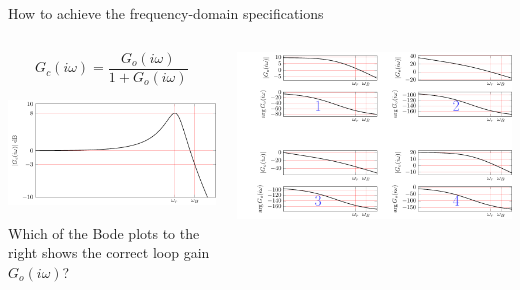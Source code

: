\documentclass[presentation,aspectratio=169]{beamer}
\begin{document}
\begin{frame}[label={sec:org7b0788d}]{How to achieve the frequency-domain specifications}
\begin{columns}
\begin{column}{0.28\columnwidth}
\[G_c(i\omega) = \frac{ G_o(i\omega)}{1 + G_o(i\omega)}\]

\includegraphics[width=1.1\linewidth]{../../figures/spec-bode-closed-loop-new}

Which of the Bode plots to the right shows the correct loop gain \(G_o(i\omega)\)?
\end{column}

\begin{column}{0.72\columnwidth}
\begin{center}
\includegraphics[width=1.02\linewidth]{../../figures/spec-bode-open-loop-new}
\end{center}
\end{column}
\end{columns}
\end{frame}
\end{document}
